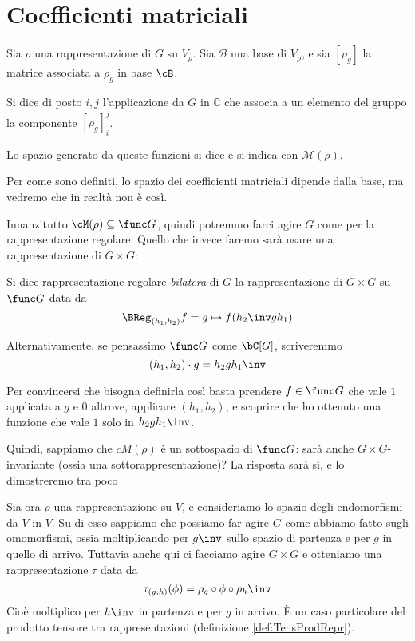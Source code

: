 \section{Coefficienti matriciali}
	\begin{mydef}
		Sia $\rho$ una rappresentazione di $G$ su $V_\rho$. Sia $\mathcal B$ una base di $V_\rho$, e sia $[\rho_g]$ la matrice associata a $\rho_g$ in base $\cB$.
		
		Si dice  di posto $i,j$ l'applicazione da $G$ in $\mathbb C$ che associa a un elemento del gruppo la componente $[\rho_g]_i^j$.
		
		Lo spazio generato da queste funzioni si dice  e si indica con $\mathcal M(\rho)$.
	\end{mydef}
	
	Per come sono definiti, lo spazio dei coefficienti matriciali dipende dalla base, ma vedremo che in realtà non è così.
	
	Innanzitutto $\cM(\rho) \subseteq \func G$, quindi potremmo farci agire $G$ come per la rappresentazione regolare. Quello che invece faremo sarà usare una rappresentazione di $G\times G$:
	
	\begin{mydef}
		Si dice rappresentazione regolare \emph{bilatera} di $G$ la rappresentazione di $G \times G$ su $\func G$ data da
		\[
			\BReg_{(h_1,h_2)}f = g \mapsto f(h_2\inv g h_1)
		\]
		
		Alternativamente, se pensassimo $\func G$ come $\bC[G]$, scriveremmo
		\[
			(h_1,h_2)\cdot g = h_2gh_1\inv
		\]

	\end{mydef}
	Per convincersi che bisogna definirla così basta prendere $f\in\func G$ che vale $1$ applicata a $g$ e $0$ altrove, applicare $(h_1,h_2)$, e scoprire che ho ottenuto una funzione che vale $1$ solo in $h_2gh_1\inv$.
	
	Quindi, sappiamo che $cM(\rho)$ è un sottospazio di $\func G$: sarà anche $G\times G$-invariante (ossia una sottorappresentazione)? La risposta sarà sì, e lo dimostreremo tra poco

	Sia ora $\rho$ una rappresentazione su $V$, e consideriamo lo spazio degli endomorfismi da $V$ in $V$. Su di esso sappiamo che possiamo far agire $G$ come abbiamo fatto sugli omomorfismi, ossia moltiplicando per $g\inv$ sullo spazio di partenza e per $g$ in quello di arrivo. Tuttavia anche qui ci facciamo agire $G\times G$ e otteniamo una rappresentazione $\tau$ data da
	\[
		\tau_{(g,h)} (\phi) = \rho_g \circ \phi \circ \rho_h\inv
	\]
	Cioè moltiplico per $h\inv$ in partenza e per $g$ in arrivo. \`E un caso particolare del prodotto tensore tra rappresentazioni (definizione \ref{def:TensProdRepr}).
	
